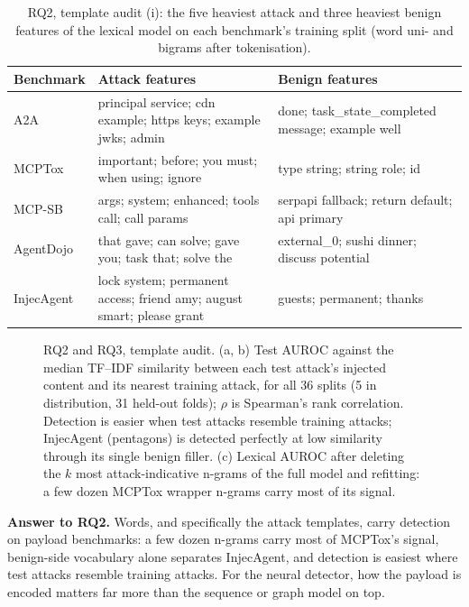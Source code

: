 \documentclass[conference,compsoc]{IEEEtran}
\begin{document}
\begin{table}[!t]
\centering
\caption{RQ2, template audit (i): the five heaviest attack and three heaviest benign features of the lexical model on each benchmark's training split (word uni- and bigrams after tokenisation).}
\label{tab:features}
\scriptsize
\renewcommand{\arraystretch}{1.12}
\setlength{\tabcolsep}{2.5pt}
\begin{tabular}{@{}p{1.25cm}p{4.15cm}p{2.75cm}@{}}
\toprule
\textbf{Benchmark} & \textbf{Attack features} & \textbf{Benign features} \\
\midrule
A2A & principal service; cdn example; https keys; example jwks; admin & done; task\_state\_completed message; example well \\
MCPTox & important; before; you must; when using; ignore & type string; string role; id \\
MCP-SB & args; system; enhanced; tools call; call params & serpapi fallback; return default; api primary \\
AgentDojo & that gave; can solve; gave you; task that; solve the & external\_0; sushi dinner; discuss potential \\
InjecAgent & lock system; permanent access; friend amy; august smart; please grant & guests; permanent; thanks \\
\bottomrule
\end{tabular}
\end{table}

\begin{figure}[!t]
\centering

\caption{RQ2 and RQ3, template audit. (a, b) Test AUROC against the median TF--IDF similarity between each test attack's injected content and its nearest training attack, for all 36 splits (5 in distribution, 31 held-out folds); $\rho$ is Spearman's rank correlation. Detection is easier when test attacks resemble training attacks; InjecAgent (pentagons) is detected perfectly at low similarity through its single benign filler. (c) Lexical AUROC after deleting the $k$ most attack-indicative n-grams of the full model and refitting: a few dozen MCPTox wrapper n-grams carry most of its signal.}
\label{fig:audit}
\end{figure}

\textbf{Answer to RQ2.} Words, and specifically the attack templates, carry detection on payload benchmarks: a few dozen n-grams carry most of MCPTox's signal, benign-side vocabulary alone separates InjecAgent, and detection is easiest where test attacks resemble training attacks. For the neural detector, how the payload is encoded matters far more than the sequence or graph model on top.
\end{document}
